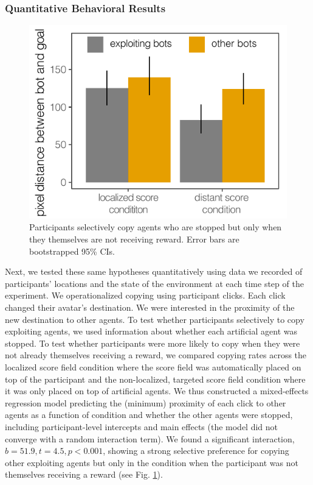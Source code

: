 \documentclass[12pt,letterpaper]{article}
\begin{document}
\subsubsection{Quantitative Behavioral Results}

\begin{figure}
    \centering
    \includegraphics[width=0.8 \linewidth]{figures/proximity.pdf}
    \vspace{-1em}
    \caption{Participants selectively copy agents who are stopped but only when they themselves are not receiving reward. Error bars are bootstrapped 95\% CIs.}
    \label{fig:proximity}
\end{figure}

Next, we tested these same hypotheses quantitatively using data we recorded of participants' locations and the state of the environment at each time step of the experiment.
We operationalized copying using participant clicks.
Each click changed their avatar's destination. 
We were interested in the proximity of the new destination to other agents.
To test whether participants selectively to copy exploiting agents, we used information about whether each artificial agent was stopped.
To test whether participants were more likely to copy when they were not already themselves receiving a reward, we compared copying rates across the localized score field condition where the score field was automatically placed on top of the participant and the non-localized, targeted score field condition where it was only placed on top of artificial agents.
We thus constructed a mixed-effects regression model predicting the (minimum) proximity of each click to other agents as a function of condition and whether the other agents were stopped, including participant-level intercepts and main effects (the model did not converge with a random interaction term). 
We found a significant interaction, $b = 51.9, t = 4.5, p < 0.001$, showing a strong selective preference for copying other exploiting agents but only in the condition when the participant was not themselves receiving a reward (see Fig. \ref{fig:proximity}). 
\end{document}
